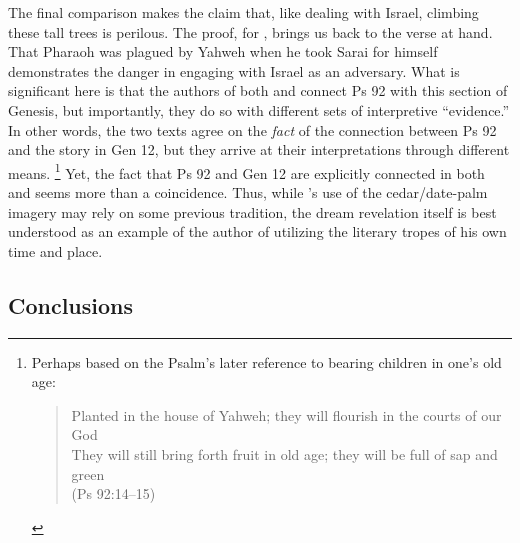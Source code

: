 The final comparison makes the claim that, like dealing with Israel, climbing these tall trees is perilous. The proof, for \GenRabbah, brings us back to the verse at hand. That Pharaoh was plagued by Yahweh when he took Sarai for himself demonstrates the danger in engaging with Israel as an adversary. What is significant here is that the authors of both \ga and \GenRabbah connect Ps 92 with this section of Genesis, but importantly, they do so with different sets of interpretive ``evidence.'' In other words, the two texts agree on the \emph{fact} of the connection between Ps 92 and the story in Gen 12, but they arrive at their interpretations through different means.
%
\footnote{%
\begin{SingleSpace}Perhaps based on the Psalm's later reference to bearing children in one's old age:
\begin{quote}
    Planted in the house of Yahweh; they will flourish in the courts of our God\\
    They will still bring forth fruit in old age; they will be full of sap and green\\
    (Ps 92:14--15)
\end{quote}
\end{SingleSpace}}
%
Yet, the fact that Ps 92 and Gen 12 are explicitly connected in both \ga and \GenRabbah seems more than a coincidence. Thus, while \ga's use of the cedar/date-palm imagery may rely on some previous tradition, the dream revelation itself is best understood as an example of the author of \ga utilizing the literary tropes of his own time and place. 



\subsection{Conclusions}

